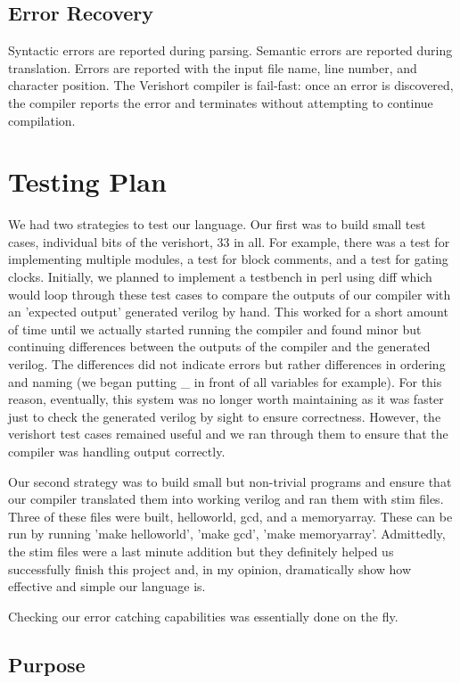 \documentclass[letterpaper,11pt]{article}
\begin{document}
    \subsection{Error Recovery}
	Syntactic errors are reported during parsing.  Semantic errors are reported during translation.  Errors are reported with the input file name, line number, and character position.  The Verishort compiler is fail-fast: once an error is discovered, the compiler reports the error and terminates without attempting to continue compilation.
\section{Testing Plan}
We had two strategies to test our language.  Our first was to build small test cases, individual bits of the verishort, 33 in all.  For example, there was a test for implementing multiple modules, a test for block comments, and a test for gating clocks.  Initially, we planned to implement a testbench in perl using diff which would loop through these test cases to compare the outputs of our compiler with an 'expected output' generated verilog by hand.  This worked for a short amount of time until we actually started running the compiler and found minor but continuing differences between the outputs of the compiler and the generated verilog.  The differences did not indicate errors but rather differences in ordering and naming (we began putting _ in front of all variables for example).  For this reason, eventually, this system was no longer worth maintaining as it was faster just to check the generated verilog by sight to ensure correctness.  However, the verishort test cases remained useful and we ran through them to ensure that the compiler was handling output correctly.

Our second strategy was to build small but non-trivial programs and ensure that our compiler translated them into working verilog and ran them with stim files.  Three of these files were built, helloworld, gcd, and a memoryarray.  These can be run by running 'make helloworld', 'make gcd', 'make memoryarray'.  Admittedly, the stim files were a last minute addition but they definitely helped us successfully finish this project and, in my opinion, dramatically show how effective and simple our language is.

Checking our error catching capabilities was essentially done on the fly.
    \subsection{Purpose}
\end{document}
